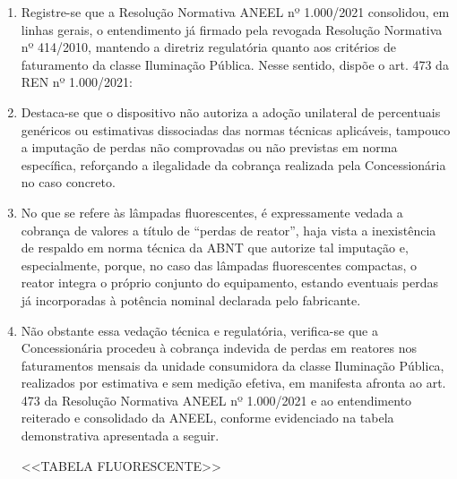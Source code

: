\begin{enumerate}[resume]
<<TABELA VAPOR>> %

\item %
Registre-se que a Resolução Normativa ANEEL nº 1.000/2021 consolidou, em linhas 
gerais, o entendimento já firmado pela revogada Resolução Normativa nº 414/2010, 
mantendo a diretriz regulatória quanto aos critérios de faturamento da classe 
Iluminação Pública. Nesse sentido, dispõe o art. 473 da REN nº 1.000/2021: 

\fi

\ifperdaVapor
\item %
Destaca-se que o dispositivo não autoriza a adoção unilateral de percentuais genéricos ou estimativas dissociadas das normas técnicas aplicáveis, tampouco a imputação de perdas não comprovadas ou não previstas em norma específica, reforçando a ilegalidade da cobrança realizada pela Concessionária no caso concreto.
\fi

\ifperdaFluorescente
\item %
No que se refere às lâmpadas fluorescentes, é expressamente vedada a cobrança de valores a título de “perdas de reator”, haja vista a inexistência de respaldo em norma técnica da ABNT que autorize tal imputação e, especialmente, porque, no caso das lâmpadas fluorescentes compactas, o reator integra o próprio conjunto do equipamento, estando eventuais perdas já incorporadas à potência nominal declarada pelo fabricante. 

\item %
Não obstante essa vedação técnica e regulatória, verifica-se que a Concessionária procedeu à cobrança indevida de perdas em reatores nos faturamentos mensais da unidade consumidora da classe Iluminação Pública, realizados por estimativa e sem medição efetiva, em manifesta afronta ao art. 473 da Resolução Normativa ANEEL nº 1.000/2021 e ao entendimento reiterado e consolidado da ANEEL, conforme evidenciado na tabela demonstrativa apresentada a seguir.

<<TABELA FLUORESCENTE>> %
\fi


\end{enumerate}
